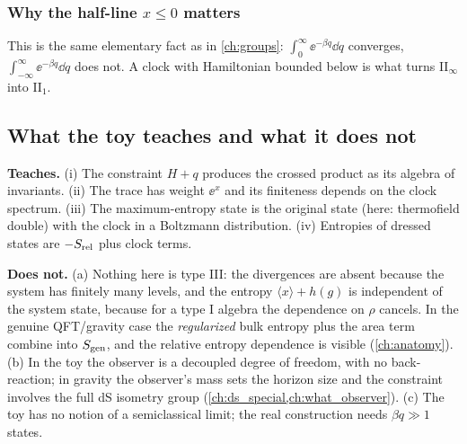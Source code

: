 \subsubsection*{Why the half-line $x\le0$ matters}
\begin{center}
\renewcommand{\arraystretch}{1.3}
\end{center}
This is the same elementary fact as in \cref{ch:groups}: $\int_0^\infty\ee^{-\beta q}\dd q$ converges, $\int_{-\infty}^\infty\ee^{-\beta q}\dd q$ does not. A clock with Hamiltonian bounded below is what turns II$_\infty$ into II$_1$.

\subsection{What the toy teaches and what it does not}

\textbf{Teaches.}
(i) The constraint $H+q$ produces the crossed product as its algebra of invariants. (ii) The trace has weight $\ee^{x}$ and its finiteness depends on the clock spectrum. (iii) The maximum-entropy state is the original state (here: thermofield double) with the clock in a Boltzmann distribution. (iv) Entropies of dressed states are $-S_{\rm rel}$ plus clock terms.

\textbf{Does not.}
(a) Nothing here is type III: the divergences are absent because the system has finitely many levels, and the entropy $\langle x\rangle+h(g)$ is independent of the system state, because for a type I algebra the dependence on $\rho$ cancels. In the genuine QFT/gravity case the \emph{regularized} bulk entropy plus the area term combine into $S_{\mathrm{gen}}$, and the relative entropy dependence is visible (\cref{ch:anatomy}). (b) In the toy the observer is a decoupled degree of freedom, with no back-reaction; in gravity the observer's mass sets the horizon size and the constraint involves the full dS isometry group (\cref{ch:ds_special,ch:what_observer}). (c) The toy has no notion of a semiclassical limit; the real construction needs $\beta q\gg1$ states.

